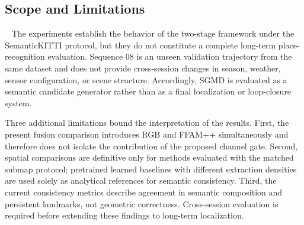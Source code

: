 \subsection{Scope and Limitations}~\label{subsec:scope-limitations}
The experiments establish the behavior of the two-stage framework under the SemanticKITTI protocol, but they do not constitute a complete long-term place-recognition evaluation. Sequence 08 is an unseen validation trajectory from the same dataset and does not provide cross-session changes in season, weather, sensor configuration, or scene structure. Accordingly, SGMD is evaluated as a semantic candidate generator rather than as a final localization or loop-closure system.

Three additional limitations bound the interpretation of the results. First, the present fusion comparison introduces RGB and FFAM++ simultaneously and therefore does not isolate the contribution of the proposed channel gate. Second, spatial comparisons are definitive only for methods evaluated with the matched submap protocol; pretrained learned baselines with different extraction densities are used solely as analytical references for semantic consistency. Third, the current consistency metrics describe agreement in semantic composition and persistent landmarks, not geometric correctness. Cross-session evaluation is required before extending these findings to long-term localization.
